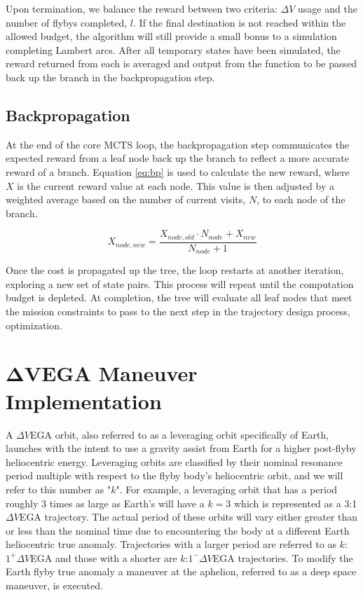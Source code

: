 \documentclass[letterpaper, preprint, paper,11pt]{AAS}	%
\begin{document}
Upon termination, we balance the reward between two criteria: $\Delta V$ usage and the number of flybys completed, $l$. If the final destination is not reached within the allowed budget, the algorithm will still provide a small bonus to a simulation completing Lambert arcs. After all temporary states have been simulated, the reward returned from each is averaged and output from the function to be passed back up the branch in the backpropagation step.

\subsection{Backpropagation}

At the end of the core MCTS loop, the backpropagation step communicates the expected reward from a leaf node back up the branch to reflect a more accurate reward of a branch. Equation \eqref{eq:bp} is used to calculate the new reward, where $X$ is the current reward value at each node. This value is then adjusted by a weighted average based on the number of current visits, $N$, to each node of the branch.

\begin{equation}
    \label{eq:bp}
    X_{node, new} = \frac{X_{node, old} \cdot N_{node} + X_{new}}{N_{node} + 1}
\end{equation}

Once the cost is propagated up the tree, the loop restarts at another iteration, exploring a new set of state pairs. This process will repeat until the computation budget is depleted. At completion, the tree will evaluate all leaf nodes that meet the mission constraints to pass to the next step in the trajectory design process, optimization.

\section*{$\boldsymbol{\Delta V}$EGA Maneuver Implementation}

A $\Delta V$EGA orbit, also referred to as a leveraging orbit specifically of Earth, launches with the intent to use a gravity assist from Earth for a higher post-flyby heliocentric energy\cite{Hollenbeck}. Leveraging orbits are classified by their nominal resonance period multiple with respect to the flyby body's heliocentric orbit, and we will refer to this number as "$k$". For example, a leveraging orbit that has a period roughly 3 times as large as Earth's will have a $k=3$ which is represented as a 3:1 $\Delta V$EGA trajectory. The actual period of these orbits will vary either greater than or less than the nominal time due to encountering the body at a different Earth heliocentric true anomaly. Trajectories with a larger period are referred to as $k$:$1^{+} \Delta V$EGA and those with a shorter are $k$:$1^{-} \Delta V$EGA trajectories. To modify the Earth flyby true anomaly a maneuver at the aphelion, referred to as a deep space maneuver, is executed.
\end{document}

